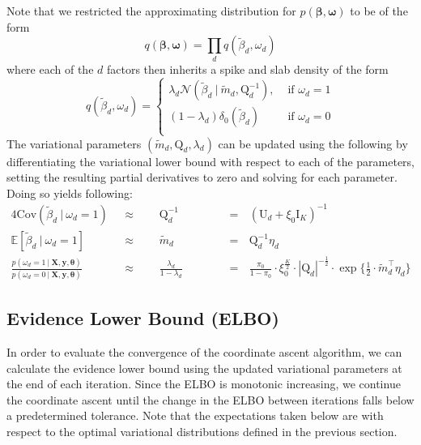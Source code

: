 \documentclass[twoside,11pt]{article}
\newcommand\given[1][]{\:#1\vert\:}
\newcommand{\transpose}[1]{#1^{\intercal}}
\newcommand{\boldbeta}{\boldsymbol\beta}
\newcommand{\E}{\mathbb{E}}
\newcommand{\betad}{\tilde{\beta}_d}
\newcommand{\umat}{\mathrm{U}}
\newcommand{\qmat}{\mathrm{Q}}
\newcommand{\pr}[1]{p \left( #1 \right)}
\begin{document}
Note that we restricted the approximating distribution for $\pr{\boldbeta, \boldsymbol\omega}$ to be of the form
$$ q \left( \boldbeta, \boldsymbol \omega\right) = \prod_{d} q \left( \betad, \omega_d \right) $$
where each of the $d$ factors then inherits a spike and slab density of the form
\[   
q \left( \betad, \omega_d \right) = 
\left\{
\begin{array}{ll}
      \lambda_d \mathcal{N} \left( \betad \given \tilde{m}_d, \qmat_d^{-1} \right),  & \textrm{ if } \omega_d = 1 \\
      (1 - \lambda_d) \delta_0 \left( \betad \right) & \textrm{ if } \omega_d = 0 \\
\end{array} 
\right. \]
The variational parameters $(\tilde{m}_d, \qmat_d, \lambda_d)$ can be updated using the following by differentiating the variational lower bound with respect to each of the parameters, setting the resulting partial derivatives to zero and solving for each parameter. Doing so yields following:
\setlength{\jot}{10pt}
\begin{alignat}{4}
  \mathrm{Cov}(\betad \given \omega_d = 1) \textrm{ } &\approx \textrm{ }&& \qmat_d^{-1} &&\textrm{ } & &= \textrm{ } \left(\umat_d + \xi_0 \mathrm{I}_K\right)^{-1} \label{eq:var_betad}\\
  \E [ \betad \given \omega_d = 1]  \textrm{ }&\approx \textrm{ } && \tilde{m}_d &&\textrm{ }& &= \textrm{ } \qmat_d^{-1} \eta_d  \label{eq:e_betad}\\
  \frac{\pr{\omega_d = 1\given \mathbf{X}, \mathbf{y}, \boldsymbol\theta}}{\pr{\omega_d = 0 \given \mathbf{X}, \mathbf{y}, \boldsymbol\theta}} \textrm{ } &\approx \textrm{ } && \frac{\lambda_d}{1-\lambda_d}&& \textrm{ }& &= \textrm{ } \frac{\pi_0}{1-\pi_0} \cdot \xi_0^{\frac{K}{2}} \cdot |\qmat_d|^{-\frac{1}{2}}\cdot \exp\Big\{\frac{1}{2} \cdot \transpose{\tilde{m}_d}\eta_d\Big\} \label{eq:logodds_lambda}
\end{alignat}


\newpage



\subsection{Evidence Lower Bound (ELBO)}
In order to evaluate the convergence of the coordinate ascent algorithm, we can calculate the evidence lower bound using the updated variational parameters at the end of each iteration. Since the ELBO is monotonic increasing, we continue the coordinate ascent until the change in the ELBO between iterations falls below a predetermined tolerance. Note that the expectations taken below are with respect to the optimal variational distributions defined in the previous section.
\end{document}
